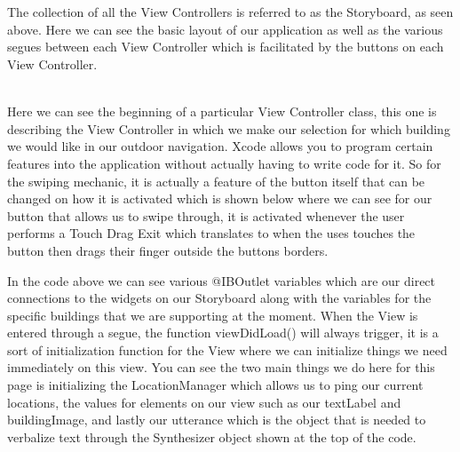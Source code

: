 \documentclass[letterpaper,12pt]{article}
\begin{document}
    \par \ \\

 \\

    The collection of all the View Controllers is referred to as the Storyboard, as seen above. Here we can see the basic layout of our application as well as the various segues between each View Controller which is facilitated by the buttons on each View Controller.
    
 \\

    Here we can see the beginning of a particular View Controller class, this one is describing the View Controller in which we make our selection for which building we would like in our outdoor navigation. Xcode allows you to program certain features into the application without actually having to write code for it. So for the swiping mechanic, it is actually a feature of the button itself that can be changed on how it is activated which is shown below where we can see for our button that allows us to swipe through, it is activated whenever the user performs a Touch Drag Exit which translates to when the uses touches the button then drags their finger outside the buttons borders. \\ \par 
    
    In the code above we can see various @IBOutlet variables which are our direct connections to the widgets on our Storyboard along with the variables for the specific buildings that we are supporting at the moment. When the View is entered through a segue, the function viewDidLoad() will always trigger, it is a sort of initialization function for the View where we can initialize things we need immediately on this view. You can see the two main things we do here for this page is initializing the LocationManager which allows us to ping our current locations, the values for elements on our view such as our textLabel and buildingImage, and lastly our utterance which is the object that is needed to verbalize text through the Synthesizer object shown at the top of the code. \\ \par
    
\end{document}

